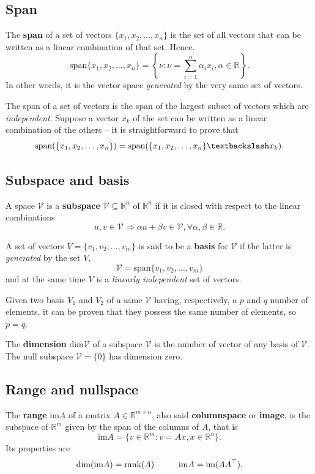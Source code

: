 \documentclass[10pt]{report}
\begin{document}
\subsection{Span}
\label{sec:orge55524a}
The \textbf{span} of a set of vectors \(\{x_1, x_2, \dots, x_n\}\) is the set of all vectors that can be written as a linear combination of that set. Hence. $$\mbox{span}\{x_1, x_2, \dots, x_n\} = \left\{\nu : \nu = \sum_{i=1}^n \alpha_i x_i, \alpha\in \mathbb{R} \right\}.$$ In other words, it is the vector space \emph{generated} by the very same set of vectors.

The span of a set of vectors is the span of the largest subset of vectors which are \emph{independent}. Suppose a vector \(x_k\) of the set can be written as a linear combination of the others -- it is straightforward to prove that $$\mbox{span}(\{x_1, x_2, \dots, x_n\}) = \mbox{span}(\{x_1, x_2, \dots, x_n\} \textbackslash x_k).$$
\subsection{Subspace and basis}
\label{sec:org0440645}
A space \(\mathcal V\) is a \textbf{subspace} \(\mathcal V \subseteq \mathbb{R}^n\) of \(\mathbb{R}^n\) if it is closed with respect to the linear combinations $$u,v \in \mathcal V \Longrightarrow \alpha u + \beta v \in \mathcal V, \forall \alpha,\beta \in \mathbb{R}.$$

A set of vectors \(V = \{v_1, v_2, \dots, v_m\}\) is said to be a \textbf{basis} for \(\mathcal V\) if the latter is \emph{generated} by the set \(V\), $$\mathcal V = \mbox{span}\{v_1, v_2, \dots, v_m\}$$ and at the same time \(V\) is a \emph{linearly independent} set of vectors.

Given two basis \(V_1\) and \(V_2\) of a same \(\mathcal V\) having, respectively, a \(p\) and \(q\) number of elements, it can be proven that they possess the same number of elements, so \(p = q\).

The \textbf{dimension} \(\mbox{dim}\mathcal V\) of a subspace \(\mathcal V\) is the number of vector of any basis of \(\mathcal V\). The null subspace \(\mathcal V = \{0\}\) has dimension zero.
\subsection{Range and nullspace}
\label{sec:org5242fa1}
The \textbf{range} \(\mbox{im} A\) of a matrix \(A \in \mathbb{R}^{m \times n}\), also said \textbf{columnspace} or \textbf{image}, is the subspace of \(\mathbb{R}^m\) given by the span of the columns of \(A\), that is $$\mbox{im} A = \{v \in \mathbb{R}^m : v = Ax, x\in \mathbb{R}^n\}.$$ Its properties are $$\mbox{dim}(\mbox{im}A) = \mbox{rank}(A) \hspace*{1cm} \mbox{im}A = \mbox{im}(AA^\top).$$
\end{document}
